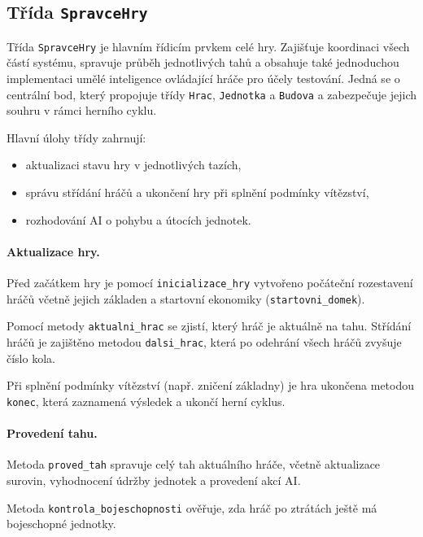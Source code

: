 \subsection{Třída \texttt{SpravceHry}}

Třída \texttt{SpravceHry} je hlavním řídicím prvkem celé hry. Zajišťuje koordinaci všech částí systému, spravuje průběh jednotlivých tahů a obsahuje také jednoduchou implementaci umělé inteligence ovládající hráče pro účely testování. Jedná se o centrální bod, který propojuje třídy \texttt{Hrac}, \texttt{Jednotka} a \texttt{Budova} a zabezpečuje jejich souhru v rámci herního cyklu.

Hlavní úlohy třídy zahrnují: 
\begin{itemize} 
    \item aktualizaci stavu hry v jednotlivých tazích, 
    \item správu střídání hráčů a ukončení hry při splnění podmínky vítězství, 
    \item rozhodování AI o pohybu a útocích jednotek. 
\end{itemize}

\paragraph{Aktualizace hry.}
Před začátkem hry je pomocí \texttt{inicializace\_hry} vytvořeno počáteční rozestavení hráčů včetně jejich základen a startovní ekonomiky (\texttt{startovni\_domek}).

Pomocí metody \texttt{aktualni\_hrac} se zjistí, který hráč je aktuálně na tahu. Střídání hráčů je zajištěno metodou \texttt{dalsi\_hrac}, která po odehrání všech hráčů zvyšuje číslo kola.

Při splnění podmínky vítězství (např. zničení základny) je hra ukončena metodou \texttt{konec}, která zaznamená výsledek a ukončí herní cyklus.

\paragraph{Provedení tahu.}
Metoda \texttt{proved\_tah} spravuje celý tah aktuálního hráče, včetně aktualizace surovin, vyhodnocení údržby jednotek a provedení akcí AI.

Metoda \texttt{kontrola\_bojeschopnosti} ověřuje, zda hráč po ztrátách ještě má bojeschopné jednotky.

